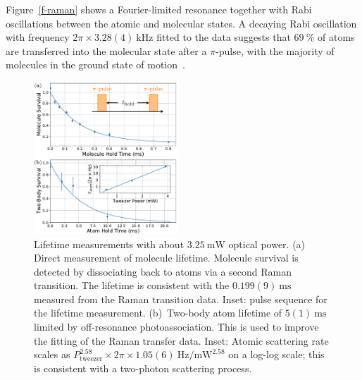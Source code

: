 \documentclass[aps,prl,twocolumn,10pt,superscriptaddress]{revtex4-1}
\begin{document}

Figure~\ref{f-raman} shows a Fourier-limited resonance together with Rabi oscillations between the atomic and molecular states.
A decaying Rabi oscillation with frequency $2\pi\times3.28(4)~\mathrm{kHz}$ fitted to the data suggests that
$69~\mathrm{\%}$ of atoms are transferred into the molecular state after a $\pi$-pulse, with the majority of molecules in the ground state of motion~\cite{Zhang2020,He331}.



\begin{figure}[ht]
  \includegraphics[width=0.48\textwidth]{imgs/fig-lifetime.pdf}
  \caption{Lifetime measurements with about $3.25~\mathrm{mW}$ optical power.
    (a) Direct measurement of molecule lifetime.
    Molecule survival is detected by dissociating back to atoms via a second Raman transition.
    The lifetime is consistent with the $0.199(9)~\mathrm{ms}$
    measured from the Raman transition data.
    Inset: pulse sequence for the lifetime measurement.
    (b)~Two-body atom lifetime of $5(1)~\mathrm{ms}$
    limited by off-resonance photoassociation.
    This is used to improve the fitting of the Raman transfer data.
    Inset: Atomic scattering rate scales as
    $P_\textrm{tweezer}^{2.58}\times\!2\pi\!\times1.05(6)~\mathrm{Hz/mW^{2.58}}$ on a log-log scale;
    this is consistent with a two-photon scattering process.
    \label{f-lifetime}}
\end{figure}
\end{document}
